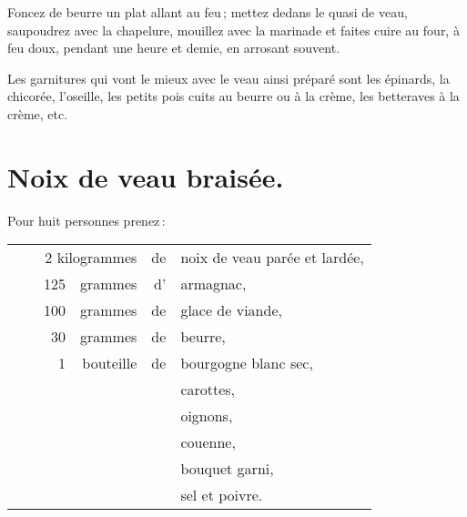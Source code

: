 Foncez de beurre un plat allant au feu ; mettez dedans le quasi de veau,
saupoudrez avec la chapelure, mouillez avec la marinade et faites cuire au
four, à feu doux, pendant une heure et demie, en arrosant souvent.

Les garnitures qui vont le mieux avec le veau ainsi préparé sont les épinards,
la chicorée, l'oseille, les petits pois cuits au beurre ou à la crème, les
betteraves à la crème, etc.

\section*{\centering Noix de veau braisée.}
{}

Pour huit personnes prenez :

\medskip

\footnotesize
\begin{longtable}{rp{2em}rrrp{16em}}
& \multicolumn{3}{r}{2 kilogrammes} & de & noix de veau parée et lardée,                                  \\
& & 125 & grammes   & d' & armagnac,                                                                      \\
& & 100 & grammes   & de & glace de viande,                                                               \\
& &  30 & grammes   & de & beurre,                                                                        \\
& &   1 & bouteille & de & bourgogne blanc sec,                                                           \\
& &     &           &    & carottes,                                                                      \\
& &     &           &    & oignons,                                                                       \\
& &     &           &    & couenne,                                                                       \\
& &     &           &    & bouquet garni,                                                                 \\
& &     &           &    & sel et poivre.                                                                 \\
\end{longtable}
\normalsize

